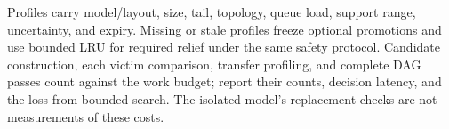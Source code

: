 Profiles carry model/layout, size, tail, topology, queue load, support
range, uncertainty, and expiry. Missing or stale profiles freeze optional
promotions and use bounded LRU for required relief under the same safety
protocol. Candidate construction, each victim comparison, transfer
profiling, and complete DAG passes count against the work budget; report
their counts, decision latency, and the loss from bounded search. The
isolated model's replacement checks are not measurements of these costs.

